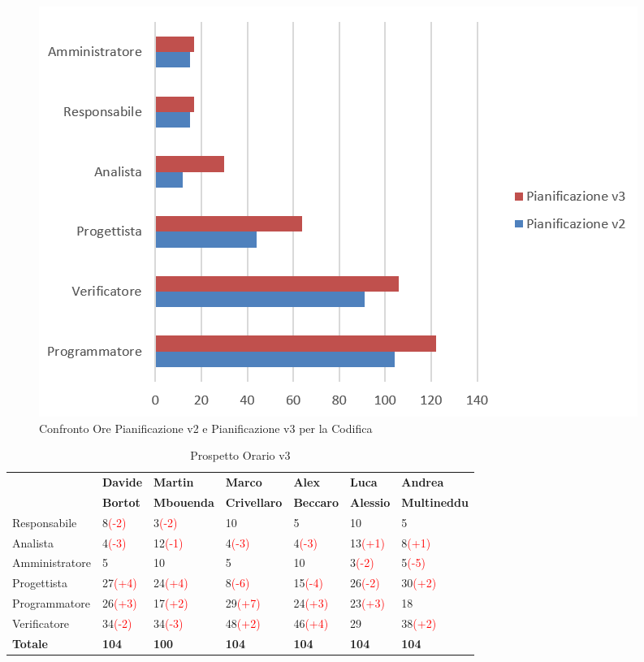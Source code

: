 \documentclass[a4paper,11pt]{article}
\begin{document}
		\begin{figure}[h!]
		    \centering
			\includegraphics[scale=0.7]{../Images/chart-Confronto_Pianificazioni2vs3_Progettazione.png}
			\caption{Confronto Ore Pianificazione v2 e Pianificazione v3 per la Codifica}
		\end{figure}		
		
		\begin{table}[h!]
		\hspace{0.2cm}\begin{tabular}{l l l l l l l}
		 	& \textbf{Davide} & \textbf{Martin} & \textbf{Marco} & \textbf{Alex} & \textbf{Luca} & \textbf{Andrea}\\
			 & \textbf{Bortot} & \textbf{Mbouenda} & \textbf{Crivellaro} & \textbf{Beccaro} & \textbf{Alessio} & \textbf{Multineddu}\\
			\midrule
			Responsabile 	& 8\textcolor{red}{(-2)} & 3\textcolor{red}{(-2)}  & 10  & 5  & 10 & 5 \\
			Analista 		& 4\textcolor{red}{(-3)}  & 12\textcolor{red}{(-1)}  & 4\textcolor{red}{(-3)}   & 4\textcolor{red}{(-3)}  & 13\textcolor{red}{(+1)}  & 8\textcolor{red}{(+1)} \\
			Amministratore 	& 5  & 10 & 5   & 10 & 3\textcolor{red}{(-2)}  & 5\textcolor{red}{(-5)}\\
			Progettista 	& 27\textcolor{red}{(+4)} & 24\textcolor{red}{(+4)} & 8\textcolor{red}{(-6)}  & 15\textcolor{red}{(-4)} & 26\textcolor{red}{(-2)} & 30\textcolor{red}{(+2)}\\
			Programmatore 	& 26\textcolor{red}{(+3)} & 17\textcolor{red}{(+2)} & 29\textcolor{red}{(+7)}  & 24\textcolor{red}{(+3)} & 23\textcolor{red}{(+3)} & 18\\
			Verificatore 	& 34\textcolor{red}{(-2)} & 34\textcolor{red}{(-3)} & 48\textcolor{red}{(+2)}  & 46\textcolor{red}{(+4)} & 29 & 38\textcolor{red}{(+2)}\\
			\midrule
			\textbf{Totale} & \textbf{104} & \textbf{100} & \textbf{104} & \textbf{104} & \textbf{104} & \textbf{104}
		\end{tabular}
	\caption{Prospetto Orario v3}
	\end{table}	
	\clearpage	
	
\end{document}
